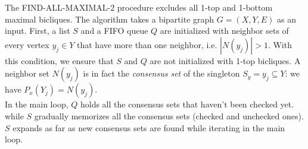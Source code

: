 \documentclass[table]{report}
\begin{document}


The FIND-ALL-MAXIMAL-2 procedure excludes all 1-top and 1-bottom maximal bicliques. The algorithm takes a bipartite graph $G = (X,Y,E)$ as an input. First, a list $S$ and a FIFO queue $Q$ are initialized with neighbor sets of every vertex $y_j \in Y$ that have more than one neighbor, i.e. $|N(y_j)| > 1$. With this condition, we ensure that $S$ and $Q$ are not initialized with 1-top bicliques. A neighbor set $N(y_j)$ is in fact the \textit{consensus set} of the singleton $S_y = {y_j} \subseteq Y$: we have $P_x(Y_j) = N(y_j)$. \\

In the main loop, $Q$ holds all the consensus sets that haven't been checked yet. while $S$ gradually memorizes all the consensus sets (checked and unchecked ones). $S$ expands as far as new consensus sets are found while iterating in the main loop.
\end{document}
